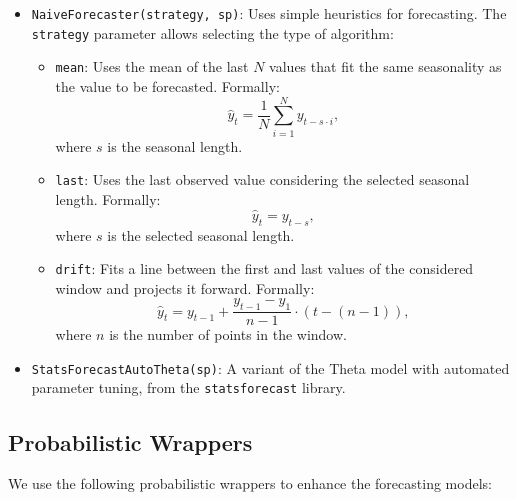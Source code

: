 \begin{itemize}
    \item \texttt{NaiveForecaster(strategy, sp)}: Uses simple heuristics for forecasting. The \texttt{strategy} parameter allows selecting the type of algorithm:
    \begin{itemize}
        \item \texttt{mean}: Uses the mean of the last \(N\) values that fit the same seasonality as the value to be forecasted. Formally:
        \begin{equation}
            \hat{y}_t = \frac{1}{N} \sum_{i=1}^N y_{t-s \cdot i},
        \end{equation}
        where \(s\) is the seasonal length.
        \item \texttt{last}: Uses the last observed value considering the selected seasonal length. Formally:
        \begin{equation}
            \hat{y}_t = y_{t-s},
        \end{equation}
        where \(s\) is the selected seasonal length.
        \item \texttt{drift}: Fits a line between the first and last values of the considered window and projects it forward. Formally:
        \begin{equation}
            \hat{y}_t = y_{t-1} + \frac{y_{t-1} - y_1}{n-1} \cdot (t - (n-1)),
        \end{equation}
        where \(n\) is the number of points in the window.
    \end{itemize}

    \item \texttt{StatsForecastAutoTheta(sp)}: A variant of the Theta model \cite{Assimakopoulos2000} with automated parameter tuning, from the \texttt{statsforecast} library.
    
\end{itemize}

\subsection{Probabilistic Wrappers}
We use the following probabilistic wrappers to enhance the forecasting models:

